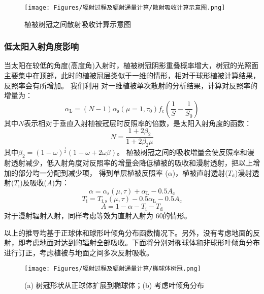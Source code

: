 {
  \begin{figure}[htbp]
    \centering
    \texttt{[image: Figures/辐射过程及辐射通量计算/散射吸收计算示意图.png]}
    \caption{植被树冠之间散射吸收计算示意图}
    \label{fig:散射吸收计算示意图}
  \end{figure}
}

\subsubsection{低太阳入射角度影响}
当太阳在较低的角度(高度角)入射时，植被树冠阴影重叠概率增大，树冠的光照面主要集中在顶部，此时的植被冠层类似于一维的情形，相对于球形植被计算结果，反照率会有所增加。
我们利用 \citet{dickinson1983land} 对一维植被单次散射的分析结果，计算对反照率的增量为：
\begin{equation}
  \alpha_{\mathrm{L}}=(N-1) \alpha_{\mathrm{s}}\left(\mu=1, \tau_{0}\right) f_{\mathrm{c}}\left(\frac{1}{S}-\frac{1}{S_{0}}\right)
\end{equation}
其中$N$表示相对于垂直入射植被冠层时反照率的倍数，是太阳入射角度的函数：
\begin{equation}
  N=\frac{1+2 \beta_{2}}{1+2 \beta_{2} \mu}
\end{equation}
其中$\beta_2=\left(1-\omega\right)^\frac{1}{2}(1-\omega+2\omega\beta)$。
植被树冠之间的吸收增量会使反照率和漫射透射减少，低入射角度对反照率的增量会降低植被的吸收和漫射透射，把以上增加的部分均一分配到减少项，
得到单层植被反照率 ($\alpha$)，植被直射透射($T_{\mathrm d}$)漫射透射($T_{\mathrm i}$)及吸收($A$)为：
\begin{equation}
  \alpha=\alpha_{\mathrm{s}}(\mu, \tau)+\alpha_{\mathrm{L}}-0.5 A_{\mathrm{c}}
\end{equation}
\begin{equation}
  T_{\mathrm{i}}=T_{\mathrm{i, s}}(\mu, \tau)-0.5 \alpha_{\mathrm{L}}-0.5 A_{\mathrm{c}}
\end{equation}
\begin{equation}
  A=1-\alpha-T_{\mathrm{i}}-T_{\mathrm{d}}
\end{equation}
对于漫射辐射入射，同样考虑等效为直射入射为 60\textdegree 的情形。

以上的推导均基于正球体和球形叶倾角分布函数情况下。另外，没有考虑地面的反射，即考虑地面对达到的辐射全部吸收。下面将分别对椭球体和非球形叶倾角分布进行订正，考虑植被与地面之间多次反射吸收。

{
  \begin{figure}[htbp]
    \centering
    \texttt{[image: Figures/辐射过程及辐射通量计算/椭球体树冠.png]}
    \caption{(a) 树冠形状从正球体扩展到椭球体；(b) 考虑叶倾角分布}
    \label{fig:椭球体树冠}
  \end{figure}
}

